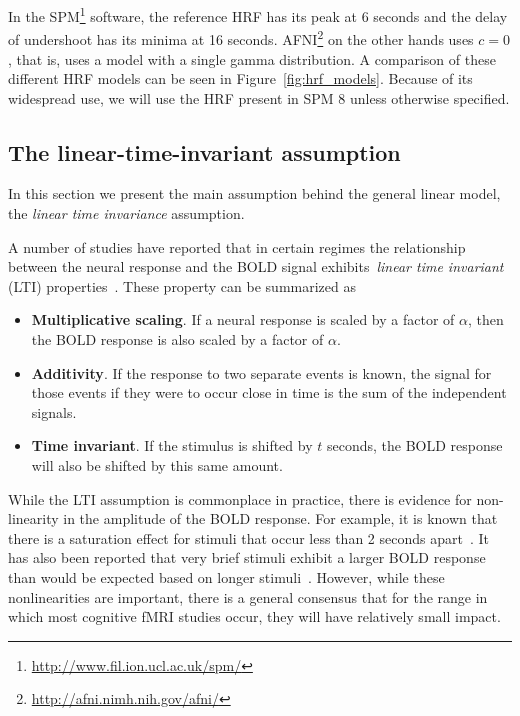 

In the SPM\footnote{\href{http://www.fil.ion.ucl.ac.uk/spm/}{http://www.fil.ion.ucl.ac.uk/spm/}} software, the reference HRF has its peak at 6 seconds and the delay of undershoot has its minima at 16 seconds. AFNI\footnote{\href{http://afni.nimh.nih.gov/afni/}{http://afni.nimh.nih.gov/afni/} } on the other hands uses $c = 0$, that is, uses a model with a single gamma  distribution. A comparison of these different HRF models can be seen in Figure~\ref{fig:hrf_models}. Because of its widespread use, we will use the HRF present in SPM 8 unless otherwise specified.






\subsection{The linear-time-invariant assumption}\label{subsec:lti}


In this section we present the main assumption behind the general linear model, the \emph{linear time invariance} assumption.

A number of studies
have reported that in certain regimes the relationship between the neural response and the BOLD signal exhibits~\emph{linear time invariant} (\gls{LTI}) properties~\citep{Boynton1996,Cohen1997,Dale1997}. These property can be summarized as
\begin{itemize}
\item {\bf Multiplicative scaling}. If a neural response is scaled by a factor of $\alpha$, then the BOLD response is also scaled by a factor of $\alpha$.
\item {\bf Additivity}. If the response to two separate events is known, the signal for those events if they were to occur close in time is the sum of the independent signals.
\item {\bf Time invariant}. If the stimulus is shifted by $t$ seconds, the BOLD response will also be shifted by this same amount.
\end{itemize}

While the LTI assumption is commonplace in practice, there is evidence for non-linearity in the amplitude of the BOLD response. For example, it is known that there is a saturation effect for stimuli that occur less than 2 seconds apart~\citep{Wager2005206}. It has also been reported that very brief stimuli exhibit a larger BOLD response than would be expected based on longer stimuli~\citep{Yesilyurt2008853}. However, while these nonlinearities are important, there is a general consensus that for the range in which most cognitive fMRI studies occur, they will have relatively small impact.


